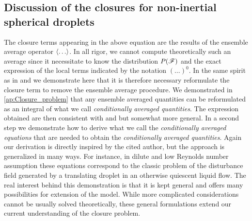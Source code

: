 \subsection{Discussion of the closures for non-inertial spherical droplets}

The closure terms appearing in the above equation are the results of the ensemble average operator $\left<\ldots\right>$. 
In all rigor, we cannot compute theoretically such an average since it necessitate to know the distribution $P(\mathscr{F})$ and the exact expression of the local terms indicated by the notation $(\ldots)^0$. 
In the same spirit as in \citet{batchelor1972sedimentation,hinch1977averaged} and \citet{zhang1994averaged} we demonstrate here that it is therefore necessary reformulate the closure term to remove the ensemble average procedure. 
We demonstrated in \ref{ap:Closure_problem} that any ensemble averaged quantities can be reformulated as an integral of what we call \textit{conditionally averaged quantities}. 
The expression obtained are then consistent with \citet{batchelor1972sedimentation,hinch1977averaged} and \citet{zhang1994averaged} but somewhat more general. 
In a second step we demonstrate how to derive what we call the \textit{conditionally averaged equations} that are needed to obtain the \textit{conditionally averaged quantities}. 
Again our derivation is directly inspired by the cited author, but the approach is generalized in many ways. 
For instance, in dilute and low Reynolds number assumption these equations correspond to the classic problem of the disturbance field generated by a translating droplet in an otherwise quiescent liquid flow. 
The real interest behind this demonstration is that it is kept general and offers many possibilities for extension of the model.
While more complicated considerations cannot be usually solved theoretically, these general formulations extend our current understanding of the closure problem. 

